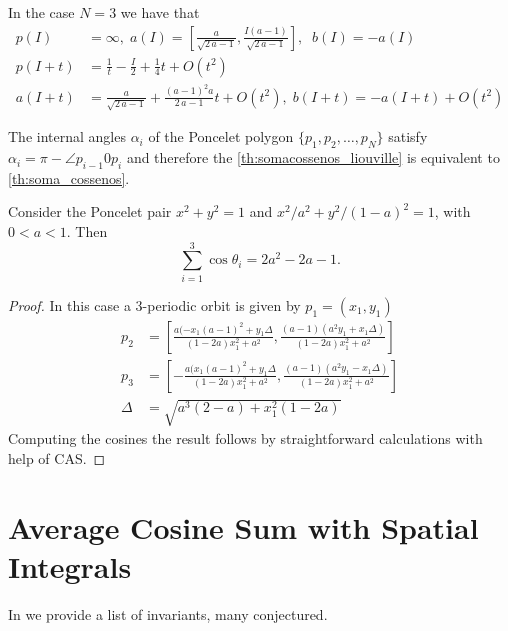 \begin{example} In the case $N=3$ we have that
\begin{align*}
p(I)&= \infty , \; a(I)=[{ {\frac {a}{\sqrt {2\,a-1}}}},     {\frac {I(a-1)}{\sqrt {2\,a-1}}}],\;\; b(I)=-a(I)\\
p(I+t)&=\frac{1}{t} -{\frac {I}{2}}+{\frac{1}{4}}t+O \left( {t}^{2} \right)  \\
a(I+t)&= { {\frac {a}{\sqrt {2\,a-1}}}}+{\frac { \left( a-1 \right) ^{2}a}{2\,
a-1}}t+O \left( {t}^{2} \right), \; b(I+t)=-a(I+t)+O(t^2)
%
\end{align*}
\end{example}
\begin{remark}
The internal angles $\alpha_i$ of the Poncelet polygon $\{p_1,p_2,\ldots, p_N\}$ satisfy
$\alpha_i=\pi-\angle p_{i-1}0p_i$ and therefore the \cref{th:somacossenos_liouville} is equivalent to \cref{th:soma_cossenos}.
\end{remark}

\begin{proposition} Consider the Poncelet pair $x^2+y^2=1$ and $x^2/a^2+y^2/(1-a)^2=1$, with $0<a<1.$
Then \[\sum_{i=1}^3\cos\theta_i=2a^2-2a-1.\]
\end{proposition}

\begin{proof} In this case a 3-periodic orbit is given
by $p_1=(x_1,y_1)$
\begin{align*}
    p_2&=\left[\frac{ a(-x_1(a - 1)^2 + y_1\Delta } { (1-2a)x_1^2 + a^2  }, \frac{(a - 1)(a^2y_1 + x_1\Delta) }{  (1-2a)x_1^2 + a^2 }
\right]\\
p_3&=\left[-\frac{ a(x_1(a - 1)^2 + y_1\Delta } { (1-2a)x_1^2 + a^2  }, \frac{(a - 1)(a^2y_1 - x_1\Delta) }{  (1-2a)x_1^2 + a^2 }
\right]\\
\Delta&= \sqrt{a^3(2-a  ) + x_1^2(1-2a )}
\end{align*}
 Computing the cosines the result follows by straightforward calculations with  help of CAS.
\end{proof}
\section{Average Cosine Sum with Spatial Integrals}


In \cite{reznik2021-fifty-invariants} we provide a list of invariants, many conjectured.
